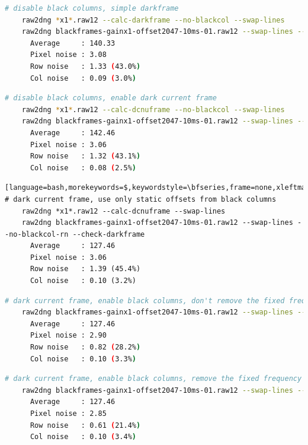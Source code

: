 {\begin{lstlisting}[language=bash,morekeywords=$,keywordstyle=\bfseries,frame=none,xleftmargin=.25in,belowskip=2em, aboveskip=2em]
    # disable black columns, simple darkframe
    raw2dng *x1*.raw12 --calc-darkframe --no-blackcol --swap-lines
    raw2dng blackframes-gainx1-offset2047-10ms-01.raw12 --swap-lines --no-blackcol --check-darkframe
      Average     : 140.33
      Pixel noise : 3.08
      Row noise   : 1.33 (43.0%)
      Col noise   : 0.09 (3.0%)
\end{lstlisting}

\begin{lstlisting}[language=bash,morekeywords=$,keywordstyle=\bfseries,frame=none,xleftmargin=.25in,belowskip=2em, aboveskip=2em]
    # disable black columns, enable dark current frame
    raw2dng *x1*.raw12 --calc-dcnuframe --no-blackcol --swap-lines
    raw2dng blackframes-gainx1-offset2047-10ms-01.raw12 --swap-lines --no-blackcol --check-darkframe
      Average     : 142.46
      Pixel noise : 3.06
      Row noise   : 1.32 (43.1%)
      Col noise   : 0.08 (2.5%)
\end{lstlisting}

\begin{lstlisting}[language=bash,morekeywords=$,keywordstyle=\bfseries,frame=none,xleftmargin=.25in,belowskip=2em,     # dark current frame, use only static offsets from black columns
    raw2dng *x1*.raw12 --calc-dcnuframe --swap-lines
    raw2dng blackframes-gainx1-offset2047-10ms-01.raw12 --swap-lines --no-blackcol-rn --check-darkframe
      Average     : 127.46
      Pixel noise : 3.06
      Row noise   : 1.39 (45.4%)
      Col noise   : 0.10 (3.2%)
\end{lstlisting}

\begin{lstlisting}[language=bash,morekeywords=$,keywordstyle=\bfseries,frame=none,xleftmargin=.25in,belowskip=2em, aboveskip=2em]
    # dark current frame, enable black columns, don't remove the fixed frequency component from black columns
    raw2dng blackframes-gainx1-offset2047-10ms-01.raw12 --swap-lines --no-blackcol-ff --check-darkframe
      Average     : 127.46
      Pixel noise : 2.90
      Row noise   : 0.82 (28.2%)
      Col noise   : 0.10 (3.3%)
\end{lstlisting}

\begin{lstlisting}[language=bash,morekeywords=$,keywordstyle=\bfseries,frame=none,xleftmargin=.25in,belowskip=2em, aboveskip=2em]
    # dark current frame, enable black columns, remove the fixed frequency component (default setting)
    raw2dng blackframes-gainx1-offset2047-10ms-01.raw12 --swap-lines --check-darkframe
      Average     : 127.46
      Pixel noise : 2.85
      Row noise   : 0.61 (21.4%)
      Col noise   : 0.10 (3.4%)
\end{lstlisting}

}
